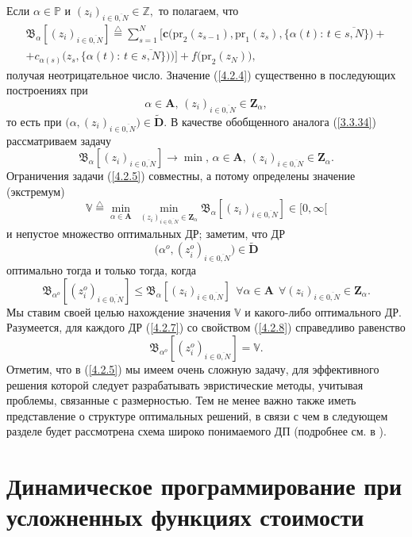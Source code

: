 \documentclass[11pt,twoside,openany]{report}
\newcommand{\bfn}{\begin{equation}}
\newcommand{\efn}{\end{equation}}
\newcommand{\df}{\stackrel{\triangle}{=}}
\newcommand{\ov}{\overline}
\newcommand{\al}{\alpha}
\newcommand{\fa}{\forall}
\newcommand{\bbz}{{\mathbb Z}}
\newcommand{\bbp}{{\mathbb P}}
\begin{document}
{Если $\al\in \bbp$ и $(z_i)_{i\in\ov{0,N}}\in \bbz,$ то полагаем, что
\begin{eqnarray}
&\mathfrak{B}_\al [(z_i)_{i\in\ov{0,N}}] \df \sum\limits_{s=1}^N
\bigl[\mathbf{c}\bigl(\mathrm{pr}_2(z_{s-1}),\mathrm{pr}_1(z_s),\{\al(t):\,
t\in \ov{s,N}\}\bigl) +
&\nonumber\\
&+  c_{\al(s)}\bigl(z_s,\{\al(t):\,t\in \ov{s,N}\}\bigl)\bigl)\bigl] +
f\bigl(\mathrm{pr}_2(z_N)\bigl),
&\label{4.2.4}
\end{eqnarray}
получая неотрицательное число. Значение (\ref{4.2.4}) существенно в
последующих построениях при
$$
\al\in \mathbf{A},\, (z_i)_{i\in\ov{0,N}}\in \mathbf{Z}_\al,
$$
то есть при $\bigl(\al,(z_i)_{i\in\ov{0,N}}\bigl)\in \widetilde{\mathbf{D}}.$
В качестве обобщенного аналога (\ref{3.3.34}) рассматриваем задачу
\bfn\label{4.2.5}
\mathfrak{B}_\al[(z_i)_{i\in\ov{0,N}}]\longrightarrow \min,\,\al\in \mathbf{A},\,
(z_i)_{i\in\ov{0,N}}\in \mathbf{Z}_\al.
\efn
Ограничения задачи (\ref{4.2.5}) совместны, а потому определены значение
(экстремум)
\bfn\label{4.2.6}
\mathbb{V} \df \min\limits_{\al\in \mathbf{A}}\
\min\limits_{(z_i)_{i\in\ov{0,N}}\in \mathbf{Z}_\al}
\mathfrak{B}_\al[(z_i)_{i\in\ov{0,N}}]\in [0,\infty[
\efn
и непустое множество оптимальных ДР; заметим, что ДР
\bfn\label{4.2.7}
\bigl(\al^o,(z_i^o)_{i\in\ov{0,N}}\bigl)\in \widetilde{\mathbf{D}}
\efn
оптимально тогда и только тогда, когда
\bfn\label{4.2.8}
\mathfrak{B}_{\al^o}[(z_i^o)_{i\in\ov{0,N}}]\leqslant \mathfrak{B}_\al
[(z_i)_{i\in\ov{0,N}}]\ \ \fa \al\in \mathbf{A}\ \ \fa
(z_i)_{i\in\ov{0,N}}\in \mathbf{Z}_\al.
\efn
Мы ставим своей целью нахождение значения $\mathbb{V}$ и какого-либо
оптимального ДР. Разумеется, для каждого ДР (\ref{4.2.7}) со свойством
(\ref{4.2.8}) справедливо равенство
$$
\mathfrak{B}_{\al^o}[(z_i^o)_{i\in\ov{0,N}}]  = \mathbb{V}.
$$
Отметим, что в (\ref{4.2.5}) мы имеем очень сложную задачу, для
эффективного решения которой следует разрабатывать эвристические методы,
учитывая проблемы, связанные с размерностью. Тем не менее важно также
иметь представление о структуре оптимальных решений, в связи с чем в
следующем разделе будет рассмотрена схема широко понимаемого ДП (подробнее
см. в \cite{Cha3`,Cha11`,Cha12`}).

{\raggedright\section{
  Динамическое программирование при усложненных функциях стоимости
}}
\label{sect:4.3}
\setcounter{equation}{0}

}
\end{document}
